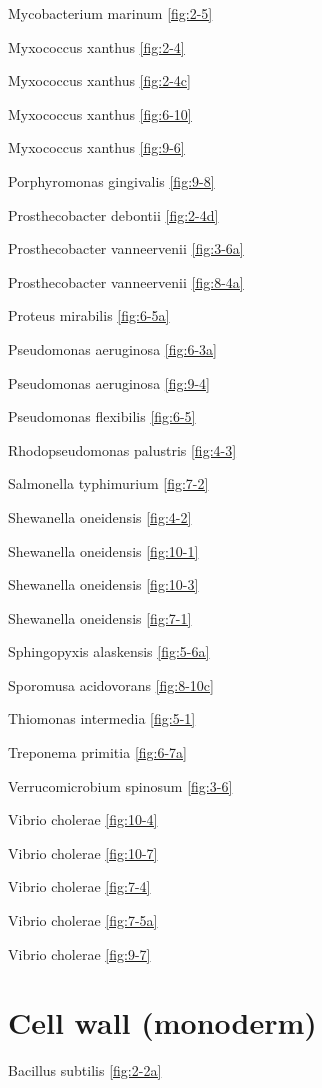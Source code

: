 \documentclass[]{tufte-book}
\begin{document}
Mycobacterium marinum \ref{fig:2-5}

Myxococcus xanthus \ref{fig:2-4}

Myxococcus xanthus \ref{fig:2-4c}

Myxococcus xanthus \ref{fig:6-10}

Myxococcus xanthus \ref{fig:9-6}

Porphyromonas gingivalis \ref{fig:9-8}

Prosthecobacter debontii \ref{fig:2-4d}

Prosthecobacter vanneervenii \ref{fig:3-6a}

Prosthecobacter vanneervenii \ref{fig:8-4a}

Proteus mirabilis \ref{fig:6-5a}

Pseudomonas aeruginosa \ref{fig:6-3a}

Pseudomonas aeruginosa \ref{fig:9-4}

Pseudomonas flexibilis \ref{fig:6-5}

Rhodopseudomonas palustris \ref{fig:4-3}

Salmonella typhimurium \ref{fig:7-2}

Shewanella oneidensis \ref{fig:4-2}

Shewanella oneidensis \ref{fig:10-1}

Shewanella oneidensis \ref{fig:10-3}

Shewanella oneidensis \ref{fig:7-1}

Sphingopyxis alaskensis \ref{fig:5-6a}

Sporomusa acidovorans \ref{fig:8-10c}

Thiomonas intermedia \ref{fig:5-1}

Treponema primitia \ref{fig:6-7a}

Verrucomicrobium spinosum \ref{fig:3-6}

Vibrio cholerae \ref{fig:10-4}

Vibrio cholerae \ref{fig:10-7}

Vibrio cholerae \ref{fig:7-4}

Vibrio cholerae \ref{fig:7-5a}

Vibrio cholerae \ref{fig:9-7}

\section*{Cell wall (monoderm)}\label{cell-wall-monoderm}

Bacillus subtilis \ref{fig:2-2a}
\end{document}
